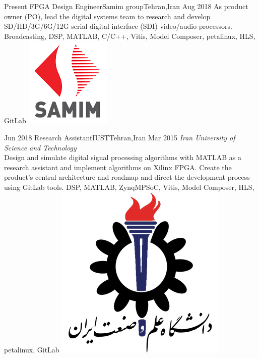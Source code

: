 
\begin{experiences}

  \experience
  {Present} {FPGA Design Engineer}{Samim group}{Tehran,Iran}
  {Aug 2018} {
    As product owner (PO), lead the digital systems team to research and develop
    SD/HD/3G/6G/12G serial digital interface (SDI) video/audio processors.
  }
  {Broadcasting, DSP, MATLAB, C/C++, Vitis, Model Composer, petalinux, HLS, GitLab}
  {\includegraphics[scale=0.2]{graphics/samim_logo}}

  \emptySeparator

  \experience
  {Jun 2018} {Research Assistant}{IUST}{Tehran,Iran}
  {Mar 2015} {
    \emph{Iran University of Science and Technology}\\
    Design and simulate digital signal processing algorithms with MATLAB as a research
    assistant and implement algorithms on Xilinx FPGA. Create the product's central
    architecture and roadmap and direct the development process using GitLab tools.
  }
  {DSP, MATLAB, ZynqMPSoC, Vitis, Model Composer, HLS, petalinux, GitLab}
  {\includegraphics[scale=0.12]{graphics/IUST_logo_color}}

  \emptySeparator


\end{experiences}
